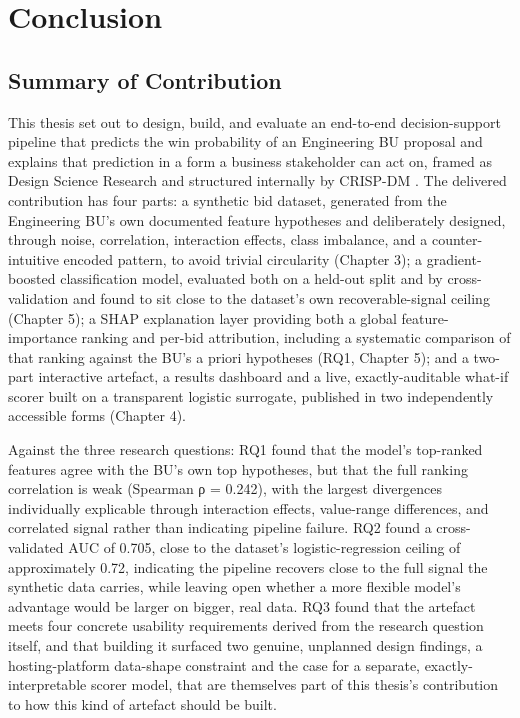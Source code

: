 \hypertarget{conclusion}{%
\chapter{Conclusion}\label{conclusion}}

\hypertarget{summary-of-contribution}{%
\section{Summary of Contribution}\label{summary-of-contribution}}

This thesis set out to design, build, and evaluate an end-to-end
decision-support pipeline that predicts the win probability of an
Engineering BU proposal and explains that prediction in a form a
business stakeholder can act on, framed as Design Science Research
\citep{peffers2007design, hevner2004design} and structured internally by
CRISP-DM \citep{chapman2000crispdm}. The delivered contribution has four
parts: a synthetic bid dataset, generated from the Engineering BU's own
documented feature hypotheses and deliberately designed, through noise,
correlation, interaction effects, class imbalance, and a
counter-intuitive encoded pattern, to avoid trivial circularity (Chapter
3); a gradient-boosted classification model, evaluated both on a
held-out split and by cross-validation and found to sit close to the
dataset's own recoverable-signal ceiling (Chapter 5); a SHAP explanation
layer providing both a global feature-importance ranking and per-bid
attribution, including a systematic comparison of that ranking against
the BU's a priori hypotheses (RQ1, Chapter 5); and a two-part
interactive artefact, a results dashboard and a live, exactly-auditable
what-if scorer built on a transparent logistic surrogate, published in
two independently accessible forms (Chapter 4).

Against the three research questions: RQ1 found that the model's
top-ranked features agree with the BU's own top hypotheses, but that the
full ranking correlation is weak (Spearman ρ = 0.242), with the largest
divergences individually explicable through interaction effects,
value-range differences, and correlated signal rather than indicating
pipeline failure. RQ2 found a cross-validated AUC of 0.705, close to the
dataset's logistic-regression ceiling of approximately 0.72, indicating
the pipeline recovers close to the full signal the synthetic data
carries, while leaving open whether a more flexible model's advantage
would be larger on bigger, real data. RQ3 found that the artefact meets
four concrete usability requirements derived from the research question
itself, and that building it surfaced two genuine, unplanned design
findings, a hosting-platform data-shape constraint and the case for a
separate, exactly-interpretable scorer model, that are themselves part
of this thesis's contribution to how this kind of artefact should be
built.

